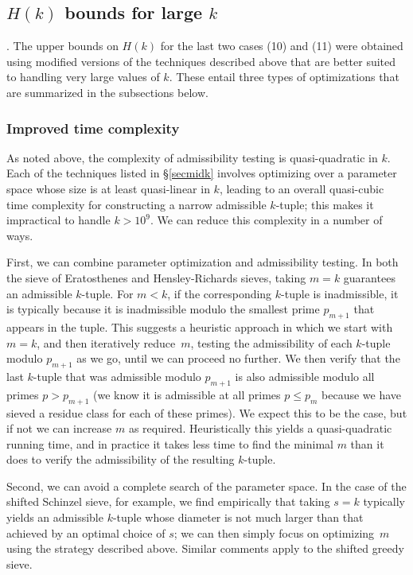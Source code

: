 \documentclass{bmcart}
\theoremstyle{plain}
\theoremstyle{definition}
\begin{document}
\subsection{\texorpdfstring{$H(k)$}{H(k)} bounds for large \texorpdfstring{$k$}{k}}.
The upper bounds on $H(k)$ for the last two cases (10) and (11) were obtained using modified versions of the techniques described above that are better suited to handling very large values of $k$.
These entail three types of optimizations that are summarized in the subsections below.

\subsubsection{Improved time complexity}
As noted above, the complexity of admissibility testing is quasi-quadratic in $k$.  Each of the techniques listed in \S\ref{secmidk} involves optimizing over a parameter space whose size is at least quasi-linear in $k$, leading to an overall quasi-cubic time complexity for constructing a narrow admissible $k$-tuple; this makes it impractical to handle $k > 10^9$.
We can reduce this complexity in a number of ways.

First, we can combine parameter optimization and admissibility testing.
In both the sieve of Eratosthenes and Hensley-Richards sieves, taking $m=k$ guarantees an admissible $k$-tuple.
For $m<k$, if the corresponding $k$-tuple is inadmissible, it is typically because it is inadmissible modulo the smallest prime $p_{m+1}$ that appears in the tuple.
This suggests a heuristic approach in which we start with $m=k$, and then iteratively reduce~$m$, testing the admissibility of each $k$-tuple modulo $p_{m+1}$ as we go, until we can proceed no further.
We then verify that the last $k$-tuple that was admissible modulo $p_{m+1}$ is also admissible modulo all primes $p > p_{m+1}$ (we know it is admissible at all primes $p \le p_m$ because we have sieved a residue class for each of these primes).  We expect this to be the case, but if not we can increase $m$ as required.
Heuristically this yields a quasi-quadratic running time, and in practice it takes less time to find the minimal $m$ than it does to verify the admissibility of the resulting $k$-tuple.

Second, we can avoid a complete search of the parameter space.
In the case of the shifted Schinzel sieve, for example, we find empirically that taking $s=k$ typically yields an admissible $k$-tuple whose diameter is not much larger than that achieved by an optimal choice of $s$; we can then simply focus on optimizing~$m$ using the strategy described above.
Similar comments apply to the shifted greedy sieve.
\end{document}
